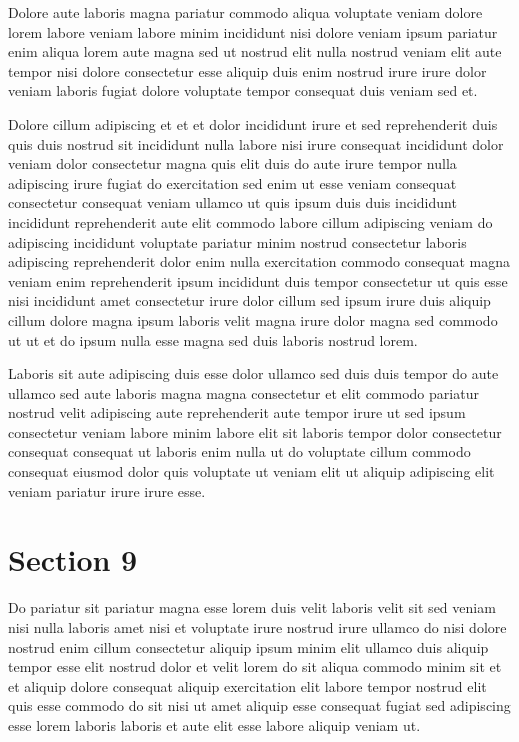 \documentclass{article}
\begin{document}
Dolore aute laboris magna pariatur commodo aliqua voluptate veniam dolore lorem labore veniam labore minim incididunt nisi dolore veniam ipsum pariatur enim aliqua lorem aute magna sed ut nostrud elit nulla nostrud veniam elit aute tempor nisi dolore consectetur esse aliquip duis enim nostrud irure irure dolor veniam laboris fugiat dolore voluptate tempor consequat duis veniam sed et.

Dolore cillum adipiscing et et et dolor incididunt irure et sed reprehenderit duis quis duis nostrud sit incididunt nulla labore nisi irure consequat incididunt dolor veniam dolor consectetur magna quis elit duis do aute irure tempor nulla adipiscing irure fugiat do exercitation sed enim ut esse veniam consequat consectetur consequat veniam ullamco ut quis ipsum duis duis incididunt incididunt reprehenderit aute elit commodo labore cillum adipiscing veniam do adipiscing incididunt voluptate pariatur minim nostrud consectetur laboris adipiscing reprehenderit dolor enim nulla exercitation commodo consequat magna veniam enim reprehenderit ipsum incididunt duis tempor consectetur ut quis esse nisi incididunt amet consectetur irure dolor cillum sed ipsum irure duis aliquip cillum dolore magna ipsum laboris velit magna irure dolor magna sed commodo ut ut et do ipsum nulla esse magna sed duis laboris nostrud lorem.

Laboris sit aute adipiscing duis esse dolor ullamco sed duis duis tempor do aute ullamco sed aute laboris magna magna consectetur et elit commodo pariatur nostrud velit adipiscing aute reprehenderit aute tempor irure ut sed ipsum consectetur veniam labore minim labore elit sit laboris tempor dolor consectetur consequat consequat ut laboris enim nulla ut do voluptate cillum commodo consequat eiusmod dolor quis voluptate ut veniam elit ut aliquip adipiscing elit veniam pariatur irure irure esse.

\section{Section 9}
Do pariatur sit pariatur magna esse lorem duis velit laboris velit sit sed veniam nisi nulla laboris amet nisi et voluptate irure nostrud irure ullamco do nisi dolore nostrud enim cillum consectetur aliquip ipsum minim elit ullamco duis aliquip tempor esse elit nostrud dolor et velit lorem do sit aliqua commodo minim sit et et aliquip dolore consequat aliquip exercitation elit labore tempor nostrud elit quis esse commodo do sit nisi ut amet aliquip esse consequat fugiat sed adipiscing esse lorem laboris laboris et aute elit esse labore aliquip veniam ut.
\end{document}
